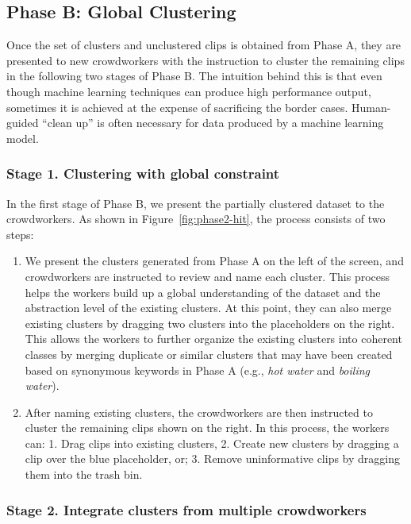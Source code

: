 \subsection{Phase B: Global Clustering}

Once the set of clusters and unclustered clips is obtained from Phase A, they
are presented to new crowdworkers with the instruction to cluster the remaining
clips in the following two stages of Phase B. The intuition behind this
is that even though machine learning techniques can produce high
performance output, sometimes it is achieved at the expense of sacrificing the
border cases. Human-guided ``clean up'' is often necessary for data produced by a
machine learning model.  

\subsubsection{Stage 1. Clustering with global constraint}

In the first stage of Phase B, we present the partially clustered dataset to
the crowdworkers.  As shown in Figure~\ref{fig:phase2-hit}, the process consists
of two steps:

\begin{enumerate}
	\item We present the clusters generated from Phase A on the
		left of the screen, and crowdworkers are instructed to review and name
		each cluster.  This process helps the workers build up a global
		understanding of the dataset and the abstraction level of the
		existing clusters. At this point, they can also merge existing
		clusters by dragging two clusters into the placeholders on the right.
		This allows the workers to further organize the existing clusters into
		coherent classes by merging duplicate or similar clusters that may
		have been created based on synonymous keywords in Phase A (e.g., \emph{hot
			water} and \emph{boiling water}).
	\item After naming existing clusters, the crowdworkers are then
		instructed to cluster the remaining clips shown on the right. In this
		process, the workers can: 1. Drag clips into existing clusters, 2.
		Create new clusters by dragging a clip over the blue placeholder, or;
		3.  Remove uninformative clips by dragging them into the trash
		bin.
\end{enumerate}

\subsubsection{Stage 2. Integrate clusters from multiple crowdworkers}

